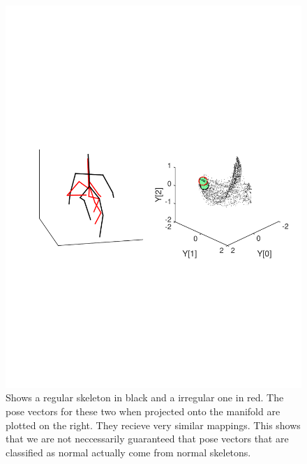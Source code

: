 \documentclass[11pt]{article} %
\begin{document}
\begin{figure}
\centering
\includegraphics*[width=1\linewidth,trim={1cm 9cm 1cm 11cm},clip]{abnormals1}
\caption{Shows a regular skeleton in black and a irregular one in red. The pose vectors for these two when projected onto the manifold are plotted on the right. They recieve very similar mappings. This shows that we are not neccessarily guaranteed that pose vectors that are classified as normal actually come from normal skeletons. }
\label{fig:abnormalManifold}
\end{figure}
\end{document}
